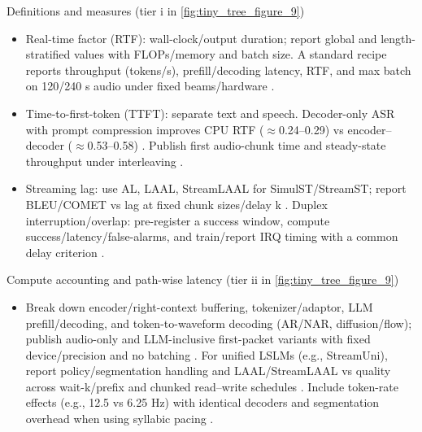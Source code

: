 \documentclass{article}
\begin{document}
Definitions and measures (tier i in \autoref{fig:tiny_tree_figure_9})
\begin{itemize}
  \item Real-time factor (RTF): wall-clock/output duration; report global and length-stratified values with FLOPs/memory and batch size. A standard recipe reports throughput (tokens/s), prefill/decoding latency, RTF, and max batch on 120/240 s audio under fixed beams/hardware \cite{lu2024fastadaspmultitaskadaptedefficientinfere}.
  \item Time-to-first-token (TTFT): separate text and speech. Decoder-only ASR with prompt compression improves CPU RTF ($\approx$0.24--0.29) vs encoder--decoder ($\approx$0.53--0.58) \cite{tsunoo2024decoderonlyarchitecturespeechrecognition}. Publish first audio-chunk time and steady-state throughput under interleaving \cite{lu2024fastadaspmultitaskadaptedefficientinfere}.
  \item Streaming lag: use AL, LAAL, StreamLAAL for SimulST/StreamST; report BLEU/COMET vs lag at fixed chunk sizes/delay k \cite{guo2025streamuniachievingstreamingspeechtransla}. Duplex interruption/overlap: pre-register a success window, compute success/latency/false-alarms, and train/report IRQ timing with a common delay criterion \cite{ma2024languagemodelcanlistenwhilespeaking}.
\end{itemize}

Compute accounting and path-wise latency (tier ii in \autoref{fig:tiny_tree_figure_9})
\begin{itemize}
  \item Break down encoder/right-context buffering, tokenizer/adaptor, LLM prefill/decoding, and token-to-waveform decoding (AR/NAR, diffusion/flow); publish audio-only and LLM-inclusive first-packet variants with fixed device/precision and no batching \cite{entry2025indicsuperbspeechprocessinguniversalperf,vashishth2024stabspeechtokenizerassessmentbenchmark}. For unified LSLMs (e.g., StreamUni), report policy/segmentation handling and LAAL/StreamLAAL vs quality across wait-k/prefix and chunked read--write schedules \cite{guo2025streamuniachievingstreamingspeechtransla}. Include token-rate effects (e.g., 12.5 vs 6.25 Hz) with identical decoders and segmentation overhead when using syllabic pacing \cite{baade2024syllablelmlearningcoarsesemanticunitsspe}.
\end{itemize}
\end{document}
